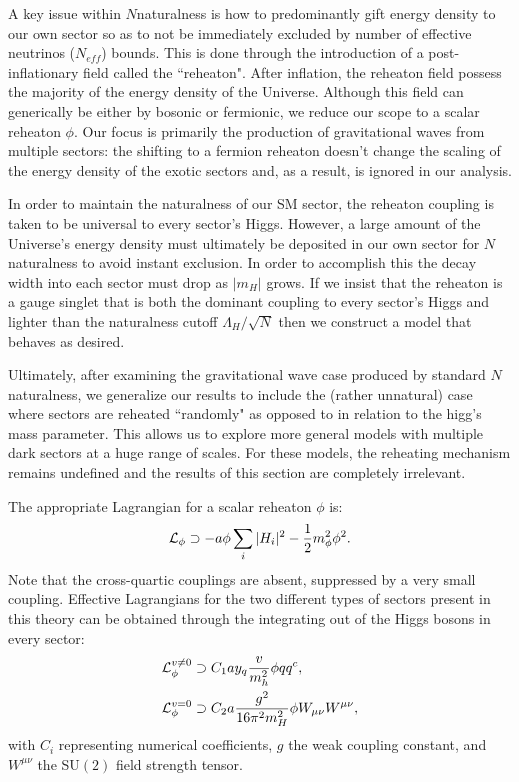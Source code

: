 \documentclass[nofootinbib,twocolumn,preprintnumbers]{revtex4-2}
\begin{document}
A key issue within $N$naturalness is how to predominantly gift energy density to our own sector so as to not be immediately excluded by number of effective neutrinos ($N_{eff}$) bounds. This is done through the introduction of a post-inflationary field called the ``reheaton". After inflation, the reheaton field possess the majority of the energy density of the Universe. Although this field can generically be either by bosonic or fermionic, we reduce our scope to a scalar reheaton $\phi$. Our focus is primarily the production of gravitational waves from multiple sectors: the shifting to a fermion reheaton doesn't change the scaling of the energy density of the exotic sectors and, as a result, is ignored in our analysis.

In order to maintain the naturalness of our SM sector, the reheaton coupling is taken to be universal to every sector's Higgs. However, a large amount of the Universe's energy density must ultimately be deposited in our own sector for $N$naturalness to avoid instant exclusion. In order to accomplish this the decay width into each sector must drop as $\vert m_H\vert$ grows. If we insist that the reheaton is a gauge singlet that is both the dominant coupling to every sector's Higgs and lighter than the naturalness cutoff $\Lambda_H/\sqrt{N}$ then we construct a model that behaves as desired. 

Ultimately, after examining the gravitational wave case produced by standard $N$naturalness, we generalize our results to include the (rather unnatural) case where sectors are reheated ``randomly" as opposed to in relation to the higg's mass parameter. This allows us to explore more general models with multiple dark sectors at a huge range of scales. For these models, the reheating mechanism remains undefined and the results of this section are completely irrelevant. 

The appropriate Lagrangian for a scalar reheaton $\phi$ is: 
\begin{equation}\label{eqn:nnLagrangian}
{\cal L}_\phi \supset -a\phi\sum_i\vert H_i\vert^2 - \frac{1}{2}m^2_\phi \phi^2.
\end{equation}
Note that the cross-quartic couplings are absent, suppressed by a very small coupling. Effective Lagrangians for the two different types of sectors present in this theory can be obtained through the integrating out of the Higgs bosons in every sector:
\begin{equation}\label{eqn:nnEffLag}
\begin{split}
{\cal L}_\phi^{v \neq 0} &\supset C_1 a y_q\frac{v}{m_h^2}\phi q q^c,
\\
{\cal L}_\phi^{v = 0} &\supset C_2 a \frac{g^2}{16\pi^2 m_H^2}\phi W_{\mu\nu}W^{\mu\nu},
\end{split}
\end{equation}
with $C_i$ representing numerical coefficients, $g$ the weak coupling constant, and $W^{\mu\nu}$ the SU$(2)$ field strength tensor.
\end{document}
